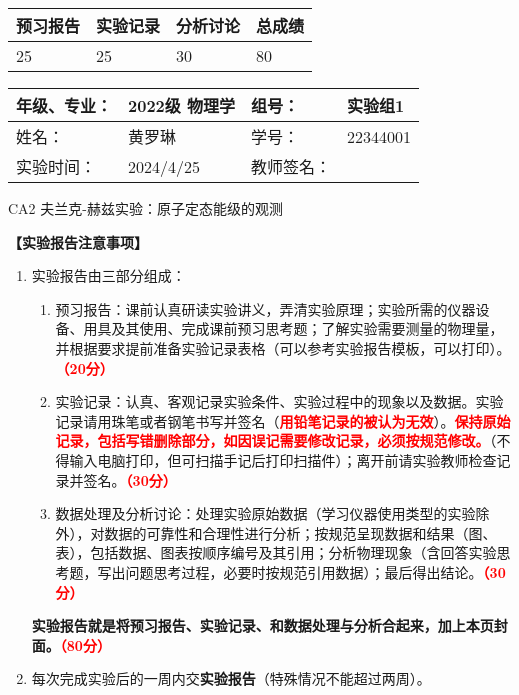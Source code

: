 \documentclass[dvipsnames, svgnames,a4paper,11pt]{article}
\begin{document}
	
	\begin{table}
		\renewcommand\arraystretch{1.7}
		\begin{tabularx}{\textwidth}{
				|X|X|X|X
				|X|X|X|X|}
			\hline
			\multicolumn{2}{|c|}{预习报告}&\multicolumn{2}{|c|}{实验记录}&\multicolumn{2}{|c|}{分析讨论}&\multicolumn{2}{|c|}{总成绩}\\
			\hline
			\LARGE25 & & \LARGE25 & & \LARGE30 & & \LARGE80 & \\
			\hline
		\end{tabularx}
	\end{table}
	
	\begin{table}
		\renewcommand\arraystretch{1.7}
		\begin{tabularx}{\textwidth}{|X|X|X|X|}
			\hline
			年级、专业： & 2022级 物理学 &组号： &实验组1 \\
			\hline
			姓名： &  黄罗琳  & 学号： & 22344001  \\
			\hline
			实验时间： & 2024/4/25 & 教师签名： & \\
			\hline
		\end{tabularx}
	\end{table}
	
	\begin{center}
		\LARGE CA2 \quad 夫兰克-赫兹实验：原子定态能级的观测
	\end{center}
	
	
	\textbf{【实验报告注意事项】}
	\begin{enumerate}
		\item 实验报告由三部分组成：
		\begin{enumerate}
			\item 预习报告：课前认真研读实验讲义，弄清实验原理；实验所需的仪器设备、用具及其使用、完成课前预习思考题；了解实验需要测量的物理量，并根据要求提前准备实验记录表格（可以参考实验报告模板，可以打印）。\textcolor{red}{\textbf{（20分）}}
			\item 实验记录：认真、客观记录实验条件、实验过程中的现象以及数据。实验记录请用珠笔或者钢笔书写并签名（\textcolor{red}{\textbf{用铅笔记录的被认为无效}}）。\textcolor{red}{\textbf{保持原始记录，包括写错删除部分，如因误记需要修改记录，必须按规范修改。}}（不得输入电脑打印，但可扫描手记后打印扫描件）；离开前请实验教师检查记录并签名。\textcolor{red}{\textbf{（30分）}}
			\item 数据处理及分析讨论：处理实验原始数据（学习仪器使用类型的实验除外），对数据的可靠性和合理性进行分析；按规范呈现数据和结果（图、表），包括数据、图表按顺序编号及其引用；分析物理现象（含回答实验思考题，写出问题思考过程，必要时按规范引用数据）；最后得出结论。\textcolor{red}{\textbf{（30分）}}
		\end{enumerate}
		\textbf{实验报告就是将预习报告、实验记录、和数据处理与分析合起来，加上本页封面。\textcolor{red}{（80分）}}
		\item 每次完成实验后的一周内交\textbf{实验报告}（特殊情况不能超过两周）。
	
		
	\end{enumerate}
	
\end{document}
